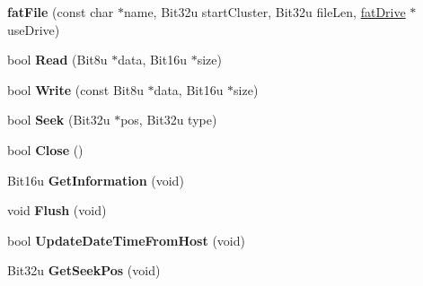 \begin{DoxyCompactItemize}
\item 
\hypertarget{classfatFile_a707d8a2cc98be6e70f191eeca63b12bc}{{\bfseries fat\-File} (const char $\ast$name, Bit32u start\-Cluster, Bit32u file\-Len, \hyperlink{classfatDrive}{fat\-Drive} $\ast$use\-Drive)}\label{classfatFile_a707d8a2cc98be6e70f191eeca63b12bc}

\item 
\hypertarget{classfatFile_a17397bf2de02a0f9dec751d705f2003e}{bool {\bfseries Read} (Bit8u $\ast$data, Bit16u $\ast$size)}\label{classfatFile_a17397bf2de02a0f9dec751d705f2003e}

\item 
\hypertarget{classfatFile_a968ede46dea29d73a0c3165b0f48e20f}{bool {\bfseries Write} (const Bit8u $\ast$data, Bit16u $\ast$size)}\label{classfatFile_a968ede46dea29d73a0c3165b0f48e20f}

\item 
\hypertarget{classfatFile_a9c778000be1ecb549b792d46acd70aae}{bool {\bfseries Seek} (Bit32u $\ast$pos, Bit32u type)}\label{classfatFile_a9c778000be1ecb549b792d46acd70aae}

\item 
\hypertarget{classfatFile_a19fc793fd59386b935bdb92b27419089}{bool {\bfseries Close} ()}\label{classfatFile_a19fc793fd59386b935bdb92b27419089}

\item 
\hypertarget{classfatFile_a6fe1adbe5bc4c82a888fd96aa719c4de}{Bit16u {\bfseries Get\-Information} (void)}\label{classfatFile_a6fe1adbe5bc4c82a888fd96aa719c4de}

\item 
\hypertarget{classfatFile_a0d4ba18b7f2712226cf1824649e151f8}{void {\bfseries Flush} (void)}\label{classfatFile_a0d4ba18b7f2712226cf1824649e151f8}

\item 
\hypertarget{classfatFile_a8bec49bbadaf2ee88e2a5cf65499f2e8}{bool {\bfseries Update\-Date\-Time\-From\-Host} (void)}\label{classfatFile_a8bec49bbadaf2ee88e2a5cf65499f2e8}

\item 
\hypertarget{classfatFile_a071f47d13150ce99c7a14aee01808322}{Bit32u {\bfseries Get\-Seek\-Pos} (void)}\label{classfatFile_a071f47d13150ce99c7a14aee01808322}

\end{DoxyCompactItemize}

